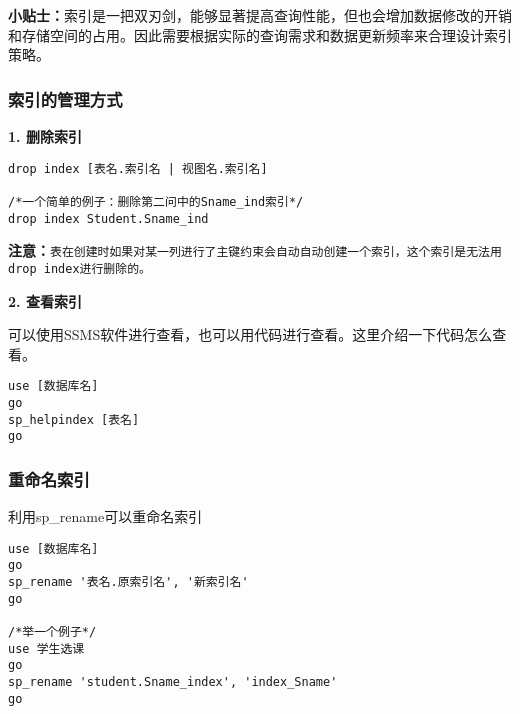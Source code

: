 \begin{mdframed}[backgroundcolor=yellow!10]
  \textbf{小贴士：}索引是一把双刃剑，能够显著提高查询性能，但也会增加数据修改的开销和存储空间的占用。因此需要根据实际的查询需求和数据更新频率来合理设计索引策略。
\end{mdframed}

\subsubsection{索引的管理方式}

\textbf{1. 删除索引}

\begin{mdframed}[backgroundcolor=gray!10]
\begin{verbatim}
drop index [表名.索引名 | 视图名.索引名]

/*一个简单的例子：删除第二问中的Sname_ind索引*/
drop index Student.Sname_ind
\end{verbatim}
\end{mdframed}

\textbf{注意：}\texttt{表在创建时如果对某一列进行了主键约束会自动自动创建一个索引，这个索引是无法用drop index进行删除的。}

\vspace{6pt}

\textbf{2. 查看索引}

\qquad 可以使用SSMS软件进行查看，也可以用代码进行查看。这里介绍一下代码怎么查看。

\begin{mdframed}[backgroundcolor=gray!10]
\begin{verbatim}
use [数据库名]
go
sp_helpindex [表名]
go
\end{verbatim}
\end{mdframed}

\subsubsection{重命名索引}

\qquad 利用sp\_rename可以重命名索引

\begin{mdframed}[backgroundcolor=gray!10]
\begin{verbatim}
use [数据库名]
go
sp_rename '表名.原索引名', '新索引名'
go

/*举一个例子*/
use 学生选课
go
sp_rename 'student.Sname_index', 'index_Sname'
go
\end{verbatim}
\end{mdframed}